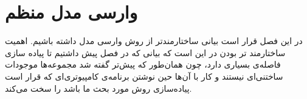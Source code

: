\chapter{وارسی مدل منظم}
در این فصل قرار است بیانی ساختارمندتر از روش وارسی مدل داشته باشیم. اهمیت ساختارمند تر بودن در این است که بیانی که در فصل پیش داشتیم تا پیاده سازی فاصله‌ی بسیاری دارد، چون همان‌طور که پیش‌تر گفته شد مجموعه‌ها موجودات ساختنی‌ای نیستند و کار با آن‌ها حین نوشتن برنامه‌ی کامپیوتری‌ای که قرار است پیاده‌سازی روش مورد بحث ما باشد را سخت می‌کند.